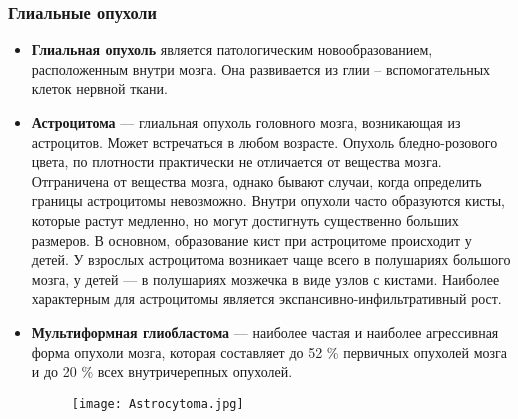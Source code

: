 \begin{frame}
  \frametitle{Глиальные опухоли}

  \begin{itemize}
  \item \textbf{Глиальная опухоль} является патологическим новообразованием, расположенным внутри мозга. 
    Она развивается из глии – вспомогательных клеток нервной ткани.
    
  \item \textbf{Астроцитома} — глиальная опухоль головного мозга, возникающая из астроцитов. 
  Может встречаться в любом возрасте. Опухоль бледно-розового цвета, по плотности практически не отличается от вещества мозга. 
  Отграничена от вещества мозга, однако бывают случаи, когда определить границы астроцитомы невозможно. 
  Внутри опухоли часто образуются кисты, которые растут медленно, но могут достигнуть существенно 
  больших размеров. В основном, образование кист при астроцитоме происходит у детей. 
  У взрослых астроцитома возникает чаще всего в полушариях большого мозга, у детей — в полушариях
  мозжечка в виде узлов с кистами. Наиболее характерным для астроцитомы является 
  экспансивно-инфильтративный рост.

  \item \textbf{Мультиформная глиобластома} — наиболее частая и наиболее агрессивная форма опухоли мозга,
  которая составляет до 52 \% первичных опухолей мозга и до 20 \% всех внутричерепных опухолей. 

    \begin{figure}
      \texttt{[image: Astrocytoma.jpg]}
    \end{figure}

  \end{itemize}
\end{frame}

